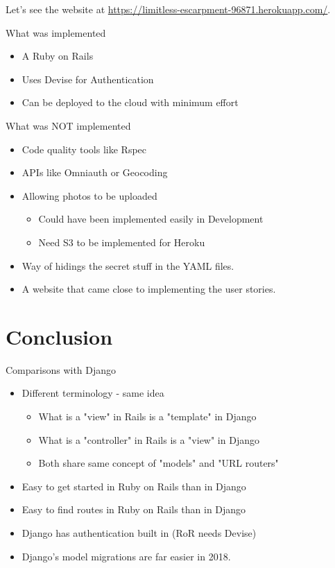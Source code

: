 \documentclass[10pt]{beamer}
\begin{document}
\begin{frame}[standout]
  Let's see the website at \url{https://limitless-escarpment-96871.herokuapp.com/}.
\end{frame}


\begin{frame}{What was implemented}
	\begin{itemize}
		\item A Ruby on Rails
		\item Uses Devise for Authentication
		\item Can be deployed to the cloud with minimum effort
	\end{itemize}
\end{frame}


\begin{frame}{What was NOT implemented}
	\begin{itemize}
		\item Code quality tools like Rspec
		\item APIs like Omniauth or Geocoding
		\item Allowing photos to be uploaded
	\begin{itemize}
		\item Could have been implemented easily in Development
		\item Need S3 to be implemented for Heroku
	\end{itemize}  
		\item Way of hidings the secret stuff in the YAML files.
		\item A website that came close to implementing the user stories.  
	\end{itemize}
\end{frame}


\section{Conclusion}

\begin{frame}{Comparisons with Django}
	\begin{itemize}
		\item Different terminology - same idea
	\begin{itemize}
		\item What is a "view" in Rails is a "template" in Django
		\item What is a "controller" in Rails is a "view" in Django
    \item Both share same concept of "models" and "URL routers"
	\end{itemize}  
		\item Easy to get started in Ruby on Rails than in Django
		\item Easy to find routes in Ruby on Rails than in Django
		\item Django has authentication built in (RoR needs Devise)
		\item Django's model migrations are far easier in 2018.
	\end{itemize}      
\end{frame}
\end{document}
